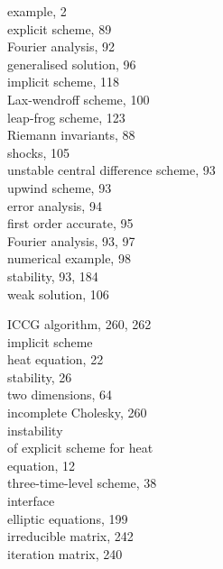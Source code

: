 \documentclass[10pt]{article}
\begin{document}
example, 2\\
explicit scheme, 89\\
Fourier analysis, 92\\
generalised solution, 96\\
implicit scheme, 118\\
Lax-wendroff scheme, 100\\
leap-frog scheme, 123\\
Riemann invariants, 88\\
shocks, 105\\
unstable central difference scheme, 93\\
upwind scheme, 93\\
error analysis, 94\\
first order accurate, 95\\
Fourier analysis, 93, 97\\
numerical example, 98\\
stability, 93, 184\\
weak solution, 106

ICCG algorithm, 260, 262\\
implicit scheme\\
heat equation, 22\\
stability, 26\\
two dimensions, 64\\
incomplete Cholesky, 260\\
instability\\
of explicit scheme for heat\\
equation, 12\\
three-time-level scheme, 38\\
interface\\
elliptic equations, 199\\
irreducible matrix, 242\\
iteration matrix, 240
\end{document}
